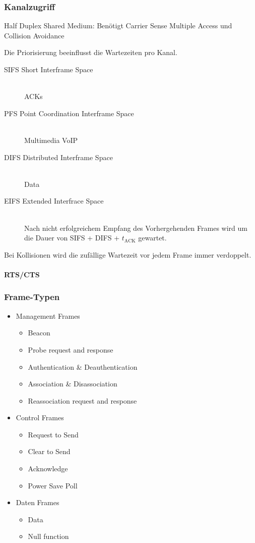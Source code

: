 \begin{multicols}{2}
	\subsubsection{Kanalzugriff}
		Half Duplex Shared Medium: Benötigt Carrier Sense Multiple Access und Collision Avoidance
		
		Die Priorisierung beeinflusst die Wartezeiten pro Kanal.
		
		\begin{description}
			\item[SIFS Short Interframe Space] \hfill \\
				ACKs
			\item[PFS Point Coordination Interframe Space] \hfill \\
				 Multimedia VoIP
			\item[DIFS Distributed Interframe Space] \hfill \\
				Data
			\item[EIFS Extended Interfrace Space] \hfill \\
				Nach nicht erfolgreichem Empfang des Vorhergehenden Frames wird um die Dauer von SIFS + DIFS + $t_{\text{ACK}}$ gewartet.
		\end{description}
		
		Bei Kollisionen wird die zufällige Wartezeit vor jedem Frame immer verdoppelt.
	
		\paragraph{RTS/CTS}
		
		
	\subsubsection{Frame-Typen}
		\begin{itemize}
			\item Management Frames \begin{itemize}
				\item Beacon
				\item Probe request and response
				\item Authentication \& Deauthentication
				\item Association \& Disassociation
				\item Reassociation request and response
				\end{itemize}
			\item Control Frames \begin{itemize}
				\item Request to Send
				\item Clear to Send
				\item Acknowledge
				\item Power Save Poll
				\end{itemize}
			\item Daten Frames \begin{itemize}
				\item Data
				\item Null function
				\end{itemize}
		\end{itemize}
		

\end{multicols}
